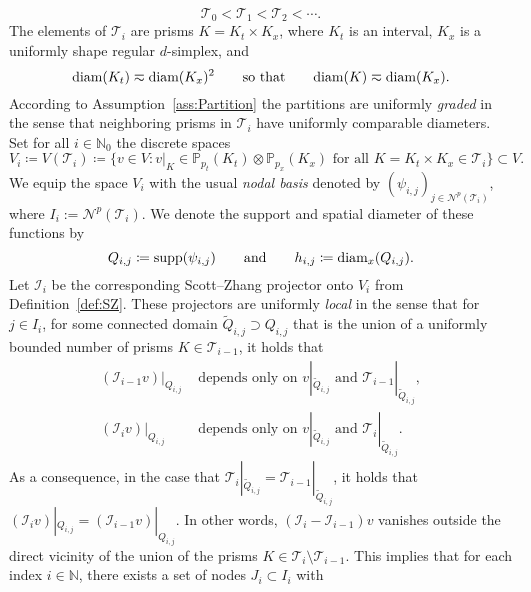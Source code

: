 \documentclass{amsart}
\providecommand{\tria}{\mathcal{T}}
\providecommand{\diam}{\textup{diam}}
\DeclareMathOperator{\supp}{supp}
\renewcommand{\P}{\mathbb P}
\newcommand{\be}{\begin{equation}}
\newcommand{\ee}{\end{equation}}
\begin{document}
\begin{equation*}
\tria_0 < \tria_1 < \tria_2 < \cdots.
\end{equation*}
The elements of $\tria_i$ are prisms $K=K_t \times K_x$, where $K_t$ is an interval,
$K_x$ is a uniformly shape regular $d$-simplex, and
\begin{equation*}
\diam (K_t) \eqsim \diam (K_x)^2\qquad\text{so that}\qquad \diam (K) \eqsim \diam (K_x).
\end{equation*}
According to Assumption~\ref{ass:Partition} the partitions are uniformly \emph{graded} in the sense that neighboring prisms in $\tria_i$ have uniformly comparable diameters.
Set for all $i\in \mathbb{N}_0$ the discrete spaces 
\begin{equation*}
V_i \coloneqq V(\tria_i) \coloneqq \{v \in V \colon v|_K \in \P_{p_t}(K_t) \otimes \P_{p_x}(K_x) \text{ for all }K = K_t \times K_x \in \tria_i\}\subset V.
\end{equation*}
We equip the space $V_i$ with the usual \emph{nodal basis} denoted by $(\psi_{i,j})_{j \in \mathcal{N}^p(\tria_i)}$, where $I_i:=\mathcal{N}^p(\tria_i)$. We denote the support and spatial diameter of these functions by
\begin{equation*}
Q_{i,j}\coloneqq \supp (\psi_{i,j})\qquad \text{and} \qquad h_{i,j}\coloneqq \diam_x (Q_{i,j}).
\end{equation*}
Let $\mathcal{I}_i$ be the corresponding Scott--Zhang projector onto $V_i$ from Definition~\ref{def:SZ}.
These projectors are uniformly \emph{local} in the sense that for $j \in I_i$, for some
connected domain $\tilde{Q}_{i,j}\supset Q_{i,j}$ that is the union of a uniformly bounded number of prisms $K \in \tria_{i-1}$, it holds that 
\be \label{eq:6mod}
\begin{aligned}
(\mathcal{I}_{i-1} v)|_{Q_{i,j}} &\text{ depends only on }v|_{\tilde{Q}_{i,j}} \text{ and } \tria_{i-1}|_{\tilde{Q}_{i,j}},\\
(\mathcal{I}_{i} v)|_{Q_{i,j}} &\text{ depends only on }v|_{\tilde{Q}_{i,j}} \text{ and } \tria_{i}|_{\tilde{Q}_{i,j}}.
%
\end{aligned}
\ee
As a consequence, in the case that $\tria_i|_{\tilde{Q}_{i,j}} =\tria_{i-1}|_{\tilde{Q}_{i,j}}$, it holds that 
 $(\mathcal{I}_i v)|_{Q_{i,j}}=(\mathcal{I}_{i-1} v)|_{Q_{i,j}}$. In other words, $(\mathcal{I}_i-\mathcal{I}_{i-1})v$ vanishes outside the direct vicinity of the union of the prisms $K \in \tria_i \setminus \tria_{i-1}$. This implies that for each index $i\in \mathbb{N}$, there exists a set of nodes $J_i \subset I_i$ with
\end{document}
